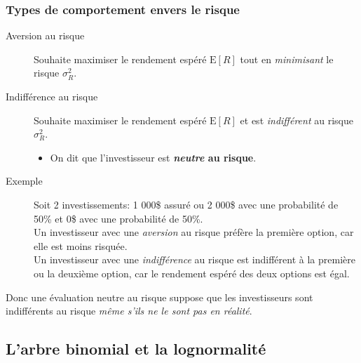 \documentclass[10pt, french]{article}
\begin{document}
\begin{multicols*}{2}
\subsubsection*{Types de comportement envers le risque}
\begin{description}
	\item[Aversion au risque]	Souhaite maximiser le rendement espéré $\text{E}[R]$ tout en \textit{minimisant} le risque $\sigma^{2}_{R}$.
	\item[Indifférence au risque]	Souhaite maximiser le rendement espéré $\text{E}[R]$ et est \textit{indifférent} au risque $\sigma^{2}_{R}$.
		\begin{itemize}
		\item	On dit que l'investisseur est \textbf{\textit{neutre} au risque}.
		\end{itemize}
	\item[Exemple]	Soit 2 investissements: 1 000\$ assuré ou 2 000\$ avec une probabilité de 50\% et 0\$ avec une probabilité de 50\%.\\
					Un investisseur avec une \textit{aversion} au risque préfère la première option, car elle est moins risquée.	\\
					Un investisseur avec une \textit{indifférence} au risque est indifférent à la première ou la deuxième option, car le rendement espéré des deux options est égal.
\end{description}

Donc une évaluation neutre au risque suppose que les investisseurs sont indifférents au risque \textit{même s'ils ne le sont pas en réalité}.



\columnbreak
\subsection{L'arbre binomial et la lognormalité}

\end{multicols*}
\end{document}
